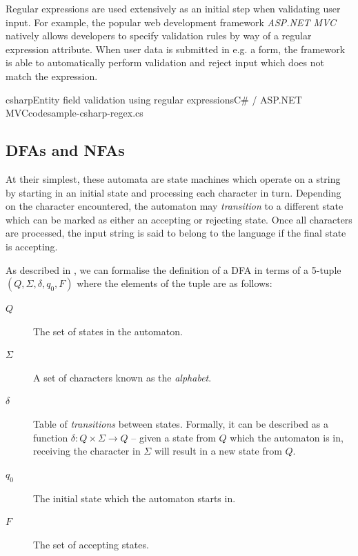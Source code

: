 \documentclass[a4paper,openany,12pt]{book}
\begin{document}
Regular expressions are used extensively as an initial step when validating user input.
For example, the popular web development framework \emph{ASP.NET MVC} natively allows developers to specify validation
rules by way of a regular expression attribute.
When user data is submitted in e.g. a form, the framework is able to automatically perform validation and reject input
which does not match the expression.

\begin{mycodefile}{csharp}{Entity field validation using regular expressions}{C\# / ASP.NET MVC}{codesample-csharp-regex.cs}
\end{mycodefile}

\subsection{DFAs and NFAs}
At their simplest, these automata are state machines which operate on a string by starting in an initial state and
processing each character in turn.
Depending on the character encountered, the automaton may \emph{transition} to a different state which can be marked as
either an accepting or rejecting state.
Once all characters are processed, the input string is said to belong to the language if the final state is accepting.

As described in \citet[p.~35]{sipser2012introduction}, we can formalise the definition of a DFA in terms of a 5-tuple
$(Q, \Sigma, \delta, q_0, F)$ where the elements of the tuple are as follows:

\begin{description}
    \item[$Q$] The set of states in the automaton.
    \item[$\Sigma$] A set of characters known as the \emph{alphabet}.
    \item[$\delta$] Table of \emph{transitions} between states.
                    Formally, it can be described as a function $\delta : Q \times \Sigma \rightarrow Q$ -- given a
                    state from $Q$ which the automaton is in, receiving the character in $\Sigma$ will result in a
                    new state from $Q$.
    \item[$q_0$] The initial state which the automaton starts in.
    \item[$F$] The set of accepting states.
\end{description}
\end{document}
